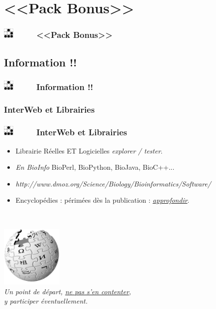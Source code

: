 \documentclass[slidetop,11pt]{beamer}
\def\sectionPartIII{<<Pack Bonus>>}
\def\sectionPartIIIa{Information !!}
\def\sectionPartIIIaUN{InterWeb et Librairies}
\def\moreInFrameTitle{\includegraphics[height=0.5cm]{img/logo_glider.png}~~~~~}
\begin{document}
\section{\sectionPartIII}
\begin{frame}
	\frametitle{\moreInFrameTitle \sectionPartIII}
	\tableofcontents[sections=3,subsectionstyle=shaded/shaded/shaded,subsubsectionstyle=shaded/shaded/shaded]
\end{frame} 

\subsection{\sectionPartIIIa}
\begin{frame}
	\frametitle{\moreInFrameTitle \sectionPartIIIa}
	\tableofcontents[sections=3,subsectionstyle=show/shaded/hide,subsubsectionstyle=show/show/hide]
\end{frame} 

\subsubsection{\sectionPartIIIaUN}
\begin{frame}
	\frametitle{\moreInFrameTitle \sectionPartIIIaUN}
	\begin{itemize}
		\item Librairie R{\'e}elles ET Logicielles \emph{explorer / tester}.  
		\item \emph{En BioInfo} BioPerl, BioPython, BioJava, BioC++...
		\item {\footnotesize \emph{http://www.dmoz.org/Science/Biology/Bioinformatics/Software/} }
		\item Encyclop{\'e}dies : p{\'e}rim{\'e}es d{\`e}s la publication : \underline{\emph{approfondir}}. 
	\end{itemize}~\\
	\begin{center}
	\includegraphics[width=3cm]{img/logo_wikipedia.png}~\\ 
	\emph{Un point de d{\'e}part, \underline{ne pas s'en contenter},~\\ y participer {\'e}ventuellement. }
	\end{center}
\end{frame} 
\end{document}
